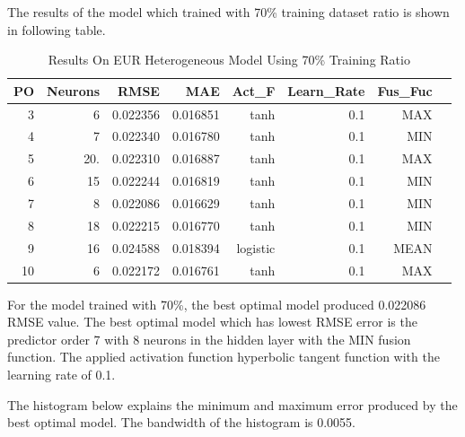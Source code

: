 {{{{{{{{{{{{{	
The results of the model which trained with 70\% training dataset ratio is shown in following table.
	
	\setlength{\tabcolsep}{0.5em} %
	{\renewcommand{\arraystretch}{1.2}
		
		\begin{table}[ht]
			\centering
			\begin{tabular}{@{}rrrrrrrr@{}}
				\toprule
				\textbf{PO}&\textbf{Neurons}& \textbf{RMSE} & \textbf{MAE} & \textbf{Act\_F}  & \textbf{Learn\_Rate} &\textbf{ Fus\_Fuc}\\ 
				\midrule
				 3 & 6 & 0.022356 & 0.016851 & tanh & 0.1 & MAX \\ 
				 4 & 7 & 0.022340 & 0.016780 & tanh & 0.1 & MIN \\ 
				 5 & 20. & 0.022310 & 0.016887 & tanh & 0.1 & MAX \\ 
				 6 & 15 & 0.022244 & 0.016819 & tanh & 0.1 & MIN \\ 
				 7 & 8 & 0.022086 & 0.016629 & tanh & 0.1 & MIN \\ 
				 8 & 18 & 0.022215 & 0.016770 & tanh & 0.1 & MIN \\ 
				 9 & 16 & 0.024588 & 0.018394 & logistic & 0.1 & MEAN \\ 
				 10 & 6 & 0.022172 & 0.016761 & tanh & 0.1 & MAX \\ 
				\hline
			\end{tabular}
			\hspace*{1cm}
			\caption{Results On EUR Heterogeneous Model Using 70\% Training Ratio }
		\end{table}
		
For the model trained with 70\%,  the best optimal model produced 0.022086 RMSE value. The best optimal model which has lowest RMSE error is the predictor order 7 with 8 neurons in the hidden layer with the MIN fusion function. The applied activation function hyperbolic tangent function with the learning rate of 0.1.
		
The histogram below explains the minimum and maximum error produced by the best optimal model. The bandwidth of the histogram is 0.0055.
		
}}}}}}}}}}}}}}
